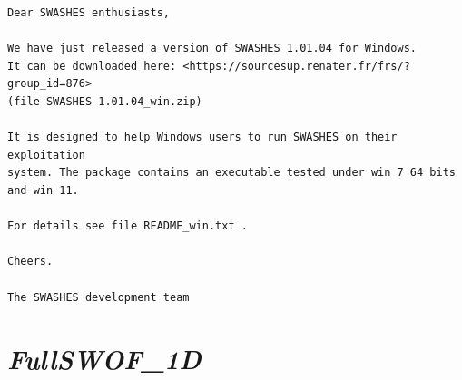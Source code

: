 \documentclass[a4paper, 11pt]{article}
\newcommand{\FullSWOFoneD}{\emph{FullSWOF\_1D}}
\begin{document}
\begin{enumerate}
\begin{verbatim}
Dear SWASHES enthusiasts,

We have just released a version of SWASHES 1.01.04 for Windows.
It can be downloaded here: <https://sourcesup.renater.fr/frs/?group_id=876> 
(file SWASHES-1.01.04_win.zip)

It is designed to help Windows users to run SWASHES on their exploitation 
system. The package contains an executable tested under win 7 64 bits and win 11.

For details see file README_win.txt .

Cheers.

The SWASHES development team 
\end{verbatim}
\end{enumerate}


\section{\FullSWOFoneD{}}
\end{document}
